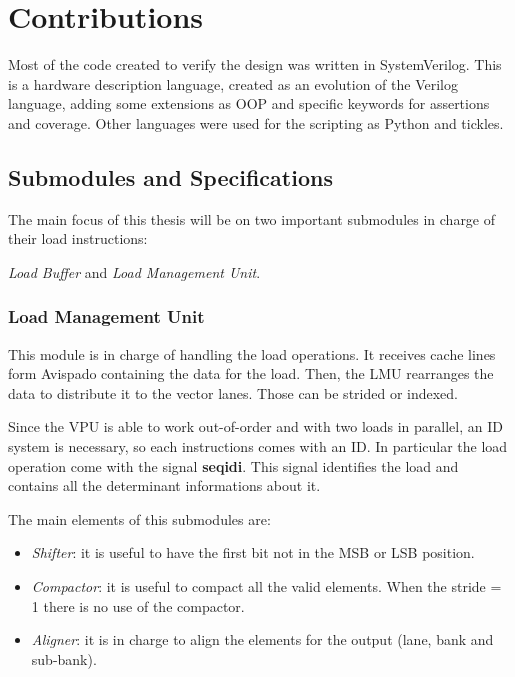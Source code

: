 \chapter{Contributions}
Most of the code created to verify the design was written in SystemVerilog. This is a hardware description language, created as an evolution of the Verilog language, adding some extensions as OOP and specific keywords for assertions and coverage.
Other languages were used for the scripting as Python and tickles.


\section{Submodules and Specifications}


The main focus of this thesis will be on two important submodules in charge of their load instructions:

\textit{Load Buffer} and \textit{Load Management Unit}.

\subsection{Load Management Unit}


This module is in charge of handling the load operations. It receives cache lines form Avispado containing the data for the load. Then, the LMU rearranges the data to distribute it to the vector lanes.
Those can be strided or indexed.

Since the VPU is able to work out-of-order and with two loads in parallel, an ID system is necessary, so each instructions comes with an ID.
In particular the load operation come with the signal \textbf{seq\+id\+i}.
This signal identifies the load and contains all the determinant informations about it.

The main elements of this submodules are:
\begin{itemize}
    \item \textit{Shifter}: it is useful to have the first bit not in the MSB or LSB position.
    
    \item \textit{Compactor}: it is useful to compact all the valid elements. When the stride = 1 there is no use of the compactor.
    
    \item \textit{Aligner}: it is in charge to align the elements for the output (lane, bank and sub-bank).
\end{itemize}

